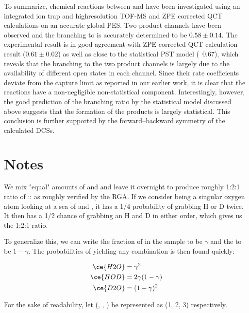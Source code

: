 To summarize, chemical reactions between  and  have been investigated using an integrated ion trap and highresolution TOF-MS and ZPE corrected QCT calculations on an accurate global PES. Two product channels have been observed and the branching to  is accurately determined to be $0.58 \pm 0.14$. The experimental result is in good agreement with ZPE corrected QCT calculation result ($0.61 \pm 0.02$) as well as close to the statistical PST model (~0.67), which reveals that the branching to the two product channels is largely due to the availability of different open states in each channel. Since their rate coefficients deviate from the capture limit as reported in our earlier work, it is clear that the  reactions have a non-negligible non-statistical component. Interestingly, however, the good prediction of the branching ratio by the statistical model discussed above suggests that the formation of the products is largely statistical. This conclusion is further supported by the forward–backward symmetry of the calculated DCSs.

\section{Notes}

We mix "equal" amounts of  and  and leave it overnight to produce roughly 1:2:1 ratio of :: as roughly verified by the RGA. If we consider being a singular oxygen atom looking at a sea of  and , it has a 1/4 probability of grabbing H or D twice. It then has a 1/2 chance of grabbing an H and D in either order, which gives us the 1:2:1 ratio.

To generalize this, we can write the fraction of  in the sample to be $\gamma$ and the  to be $1-\gamma$. The probabilities of yielding any combination is then found quickly:

\begin{align}
	\ce{H2O}& = \gamma^2 \\
	\ce{HOD}& = 2\gamma(1-\gamma) \\
	\ce{D2O}& = (1-\gamma)^2
\end{align}

For the sake of readability, let (, , ) be represented as (1, 2, 3) respectively.

